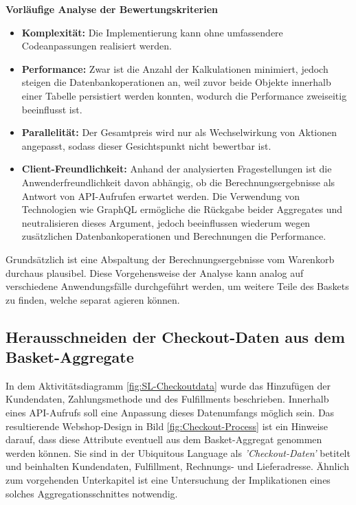 \textbf{Vorläufige Analyse der Bewertungskriterien}

\begin{itemize}[topsep=-2pt]
	\item \textbf{Komplexität: } { Die Implementierung kann ohne umfassendere Codeanpassungen realisiert werden. }
	\item \textbf{Performance: } { Zwar ist die Anzahl der Kalkulationen minimiert, jedoch steigen die Datenbankoperationen an, weil zuvor beide Objekte innerhalb einer Tabelle persistiert werden konnten, wodurch die Performance zweiseitig beeinflusst ist. }
	\item \textbf{Parallelität: } { Der Gesamtpreis wird nur als Wechselwirkung von Aktionen angepasst, sodass dieser Gesichtspunkt nicht bewertbar ist. }
	\item \textbf{Client-Freundlichkeit: } { Anhand der analysierten Fragestellungen ist die Anwenderfreundlichkeit davon abhängig, ob die Berechnungsergebnisse als Antwort von API-Aufrufen erwartet werden. Die Verwendung von Technologien wie GraphQL ermögliche die Rückgabe beider Aggregates und neutralisieren dieses Argument, jedoch beeinflussen wiederum wegen zusätzlichen Datenbankoperationen und Berechnungen die Performance. }
\end{itemize}

Grundsätzlich ist eine Abspaltung der Berechnungsergebnisse vom Warenkorb durchaus plausibel. Diese Vorgehensweise der Analyse kann analog auf verschiedene Anwendungsfälle durchgeführt werden, um weitere Teile des Baskets zu finden, welche separat agieren können. 

\subsection{Herausschneiden der Checkout-Daten aus dem Basket-Aggregate}

In dem Aktivitätsdiagramm \ref{fig:SL-Checkoutdata} wurde das Hinzufügen der Kundendaten, Zahlungsmethode und des Fulfillments beschrieben. Innerhalb eines API-Aufrufs soll eine Anpassung dieses Datenumfangs möglich sein. Das resultierende Webshop-Design in Bild \ref{fig:Checkout-Process} ist ein Hinweise darauf, dass diese Attribute eventuell aus dem Basket-Aggregat genommen werden können. Sie sind in der Ubiquitous Language als \emph{'Checkout-Daten'} betitelt und beinhalten Kundendaten, Fulfillment, Rechnungs- und Lieferadresse. Ähnlich zum vorgehenden Unterkapitel ist eine Untersuchung der Implikationen eines solches Aggregationsschnittes notwendig.


